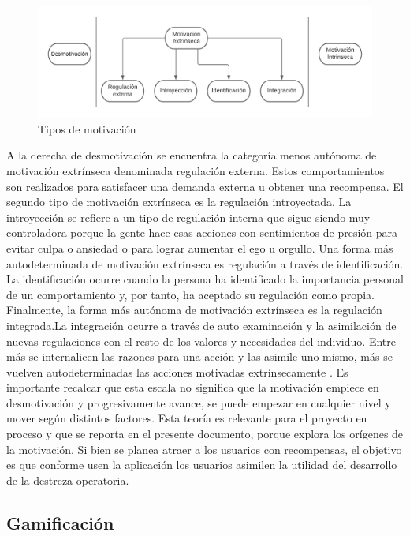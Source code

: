 \documentclass{article}
\begin{document}
\begin{figure}[h]
    \centering
    \includegraphics[scale=1]{imgs/MotivacionDiagrama.png}
    \caption{Tipos de motivación}
\end{figure}
A la derecha de desmotivación se encuentra la categoría menos autónoma de motivación extrínseca denominada regulación externa. Estos comportamientos son realizados para satisfacer una demanda externa u obtener una recompensa.
El segundo tipo de motivación extrínseca es la regulación introyectada. La introyección se refiere a un tipo de regulación interna que sigue siendo muy controladora porque la gente hace esas acciones con sentimientos de presión para evitar culpa o ansiedad o para lograr aumentar el ego u orgullo. 
Una forma más autodeterminada de motivación extrínseca es regulación a través de identificación. La identificación ocurre cuando la persona ha identificado la importancia personal de un comportamiento y, por tanto, ha aceptado su regulación como propia.
Finalmente, la forma más autónoma de motivación extrínseca es la regulación integrada.La integración ocurre a través de auto examinación y la asimilación de nuevas regulaciones con el resto de los valores y necesidades del individuo. Entre más se internalicen las razones para una acción y las asimile uno mismo, más se vuelven autodeterminadas las acciones motivadas extrínsecamente \cite{ryan2020intrinsic}.
Es importante recalcar que esta escala no significa que la motivación empiece en desmotivación y progresivamente avance, se puede empezar en cualquier nivel y mover según distintos factores.
Esta teoría es relevante para el proyecto en proceso y que se reporta en el presente documento,  porque explora los orígenes de la motivación. Si bien se planea atraer a los usuarios con recompensas, el objetivo es que conforme usen la aplicación los usuarios asimilen la utilidad del desarrollo de la destreza operatoria. 


\subsection{Gamificación}
\end{document}
